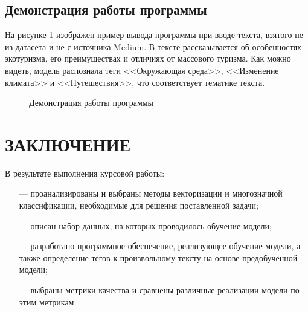 \documentclass[a4paper, 12pt]{article}
\begin{document}
\begin{large}
\subsection{Демонстрация работы программы}
На рисунке \ref{tags} изображен пример вывода программы при вводе текста, взятого не из датасета и не с источника Medium.
В тексте рассказывается об особенностях экотуризма, его преимуществах и отличиях от массового туризма. 
Как можно видеть, модель распознала теги <<Окружающая среда>>, <<Изменение климата>> и <<Путешествия>>, что соответствует тематике текста.
\begin{figure}[h!]
    \captionsetup{justification=centering}
    \caption{Демонстрация работы программы}
    \label{tags}
\end{figure}

\newpage
\titleformat{\section}[block]
{\bfseries\large\center}{\thesection}{1em}{}
\section*{ЗАКЛЮЧЕНИЕ}
В результате выполнения курсовой работы: 
\begin{itemize}
    \item[---] проанализированы и выбраны методы векторизации и многозначной классификации, необходимые для решения поставленной задачи;
    \item[---] описан набор данных, на которых проводилось обучение модели;
    \item[---] разработано программное обеспечение, реализующее обучение модели, а также определение тегов к произвольному тексту на основе предобученной модели;
    \item[---] выбраны метрики качества и сравнены различные реализации модели по этим метрикам.
\end{itemize}


\end{large}
\end{document}
